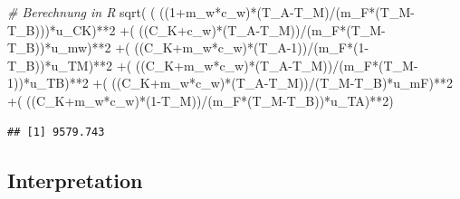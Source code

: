 \documentclass[
  9pt,
]{article}
\newenvironment{Shaded}{\begin{snugshade}}{\end{snugshade}}
\newcommand{\CommentTok}[1]{\textcolor[rgb]{0.56,0.35,0.01}{\textit{#1}}}
\newcommand{\DecValTok}[1]{\textcolor[rgb]{0.00,0.00,0.81}{#1}}
\newcommand{\FunctionTok}[1]{\textcolor[rgb]{0.00,0.00,0.00}{#1}}
\newcommand{\NormalTok}[1]{#1}
\newcommand{\SpecialCharTok}[1]{\textcolor[rgb]{0.00,0.00,0.00}{#1}}
\begin{document}
\begin{Shaded}
\begin{Highlighting}[]
\CommentTok{\# Berechnung in R}
\FunctionTok{sqrt}\NormalTok{( ( ((}\DecValTok{1}\SpecialCharTok{+}\NormalTok{m\_w}\SpecialCharTok{*}\NormalTok{c\_w)}\SpecialCharTok{*}\NormalTok{(T\_A}\SpecialCharTok{{-}}\NormalTok{T\_M)}\SpecialCharTok{/}\NormalTok{(m\_F}\SpecialCharTok{*}\NormalTok{(T\_M}\SpecialCharTok{{-}}\NormalTok{T\_B)))}\SpecialCharTok{*}\NormalTok{u\_CK)}\SpecialCharTok{**}\DecValTok{2}
     \SpecialCharTok{+}\NormalTok{( ((C\_K}\SpecialCharTok{+}\NormalTok{c\_w)}\SpecialCharTok{*}\NormalTok{(T\_A}\SpecialCharTok{{-}}\NormalTok{T\_M))}\SpecialCharTok{/}\NormalTok{(m\_F}\SpecialCharTok{*}\NormalTok{(T\_M}\SpecialCharTok{{-}}\NormalTok{T\_B))}\SpecialCharTok{*}\NormalTok{u\_mw)}\SpecialCharTok{**}\DecValTok{2}
     \SpecialCharTok{+}\NormalTok{( ((C\_K}\SpecialCharTok{+}\NormalTok{m\_w}\SpecialCharTok{*}\NormalTok{c\_w)}\SpecialCharTok{*}\NormalTok{(T\_A}\DecValTok{{-}1}\NormalTok{))}\SpecialCharTok{/}\NormalTok{(m\_F}\SpecialCharTok{*}\NormalTok{(}\DecValTok{1}\SpecialCharTok{{-}}\NormalTok{T\_B))}\SpecialCharTok{*}\NormalTok{u\_TM)}\SpecialCharTok{**}\DecValTok{2}
     \SpecialCharTok{+}\NormalTok{( ((C\_K}\SpecialCharTok{+}\NormalTok{m\_w}\SpecialCharTok{*}\NormalTok{c\_w)}\SpecialCharTok{*}\NormalTok{(T\_A}\SpecialCharTok{{-}}\NormalTok{T\_M))}\SpecialCharTok{/}\NormalTok{(m\_F}\SpecialCharTok{*}\NormalTok{(T\_M}\DecValTok{{-}1}\NormalTok{))}\SpecialCharTok{*}\NormalTok{u\_TB)}\SpecialCharTok{**}\DecValTok{2}
     \SpecialCharTok{+}\NormalTok{( ((C\_K}\SpecialCharTok{+}\NormalTok{m\_w}\SpecialCharTok{*}\NormalTok{c\_w)}\SpecialCharTok{*}\NormalTok{(T\_A}\SpecialCharTok{{-}}\NormalTok{T\_M))}\SpecialCharTok{/}\NormalTok{(T\_M}\SpecialCharTok{{-}}\NormalTok{T\_B)}\SpecialCharTok{*}\NormalTok{u\_mF)}\SpecialCharTok{**}\DecValTok{2}
     \SpecialCharTok{+}\NormalTok{( ((C\_K}\SpecialCharTok{+}\NormalTok{m\_w}\SpecialCharTok{*}\NormalTok{c\_w)}\SpecialCharTok{*}\NormalTok{(}\DecValTok{1}\SpecialCharTok{{-}}\NormalTok{T\_M))}\SpecialCharTok{/}\NormalTok{(m\_F}\SpecialCharTok{*}\NormalTok{(T\_M}\SpecialCharTok{{-}}\NormalTok{T\_B))}\SpecialCharTok{*}\NormalTok{u\_TA)}\SpecialCharTok{**}\DecValTok{2}\NormalTok{)}
\end{Highlighting}
\end{Shaded}

\begin{verbatim}
## [1] 9579.743
\end{verbatim}

\hypertarget{interpretation}{%
\subsection{Interpretation}\label{interpretation}}
\end{document}
